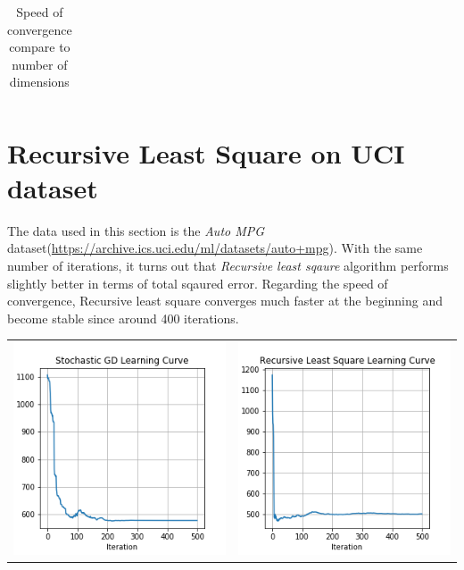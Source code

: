 \documentclass{article}
\begin{document}
\begin{table}[H]
\begin{tabular}{cccc}
\end{tabular}
\caption{Speed of convergence compare to number of dimensions}
\label{tab:rls-dim}
\end{table}

\section{Recursive Least Square on UCI dataset}
The data used in this section is the \textit{Auto MPG} dataset(\url{https://archive.ics.uci.edu/ml/datasets/auto+mpg}). With the same number of iterations, it turns out that \textit{Recursive least sqaure} algorithm performs slightly better in terms of total sqaured error. Regarding the speed of convergence, Recursive least square converges much faster at the beginning and become stable since around 400 iterations.

\begin{table}[H]
\begin{center}
\begin{tabular}{cc}
\includegraphics[scale=0.5]{MPG-SGD.png} &
\includegraphics[scale=0.5]{MPG-RLS.png}
\end{tabular}
\end{center}
\end{table}
\end{document}
